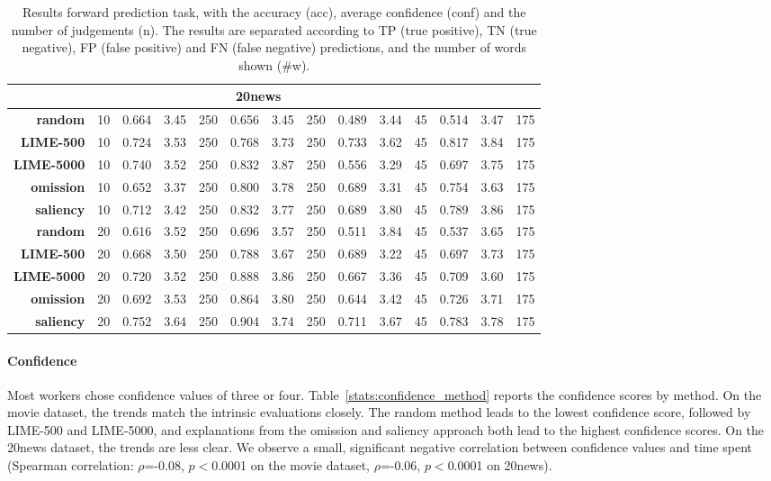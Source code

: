 \documentclass[11pt,a4paper]{article}
\begin{document}
\begin{table*}[h!]
\begin{tabular}{rc|ccc|ccc|ccc|ccc}
\midrule 
\multicolumn{13}{c}{\textbf{20news}}\\
\midrule 
\textbf{random}&10&0.664 & 3.45 & 250 & 0.656 & 3.45 & 250 & 0.489 & 3.44 & 45 & 0.514 & 3.47 & 175  \\
\textbf{LIME-500}&10&0.724 & 3.53 & 250 & 0.768 & 3.73 & 250 & 0.733 & 3.62 & 45 & 0.817 & 3.84 & 175  \\
\textbf{LIME-5000}&10&0.740 & 3.52 & 250 & 0.832 & 3.87 & 250 & 0.556 & 3.29 & 45 & 0.697 & 3.75 & 175  \\
\textbf{omission}&10&0.652 & 3.37 & 250 & 0.800 & 3.78 & 250 & 0.689 & 3.31 & 45 & 0.754 & 3.63 & 175  \\
\textbf{saliency}&10&0.712 & 3.42 & 250 & 0.832 & 3.77 & 250 & 0.689 & 3.80 & 45 & 0.789 & 3.86 & 175  \\

\textbf{random}&20&0.616 & 3.52 & 250 & 0.696 & 3.57 & 250 & 0.511 & 3.84 & 45 & 0.537 & 3.65 & 175  \\
\textbf{LIME-500}&20&0.668 & 3.50 & 250 & 0.788 & 3.67 & 250 & 0.689 & 3.22 & 45 & 0.697 & 3.73 & 175 \\
\textbf{LIME-5000}&20&0.720 & 3.52 & 250 & 0.888 & 3.86 & 250 & 0.667 & 3.36 & 45 & 0.709 & 3.60 & 175  \\
\textbf{omission}&20&0.692 & 3.53 & 250 & 0.864 & 3.80 & 250 & 0.644 & 3.42 & 45 & 0.726 & 3.71 & 175  \\

\textbf{saliency}&20&0.752 & 3.64 & 250 & 0.904 & 3.74 & 250 & 0.711 & 3.67 & 45 & 0.783 & 3.78 & 175  \\

\bottomrule 
\end{tabular} 
\caption{Results forward prediction task, with the accuracy (acc), average confidence (conf) and the number of judgements (n). The results are separated according to TP (true positive), TN (true negative), FP (false positive) and FN (false negative) predictions, and the number of words shown (\#w). }
\label{results:forward}
\end{table*}




\paragraph*{Confidence}
Most workers chose confidence values of three or four.
Table~\ref{stats:confidence_method} reports
the confidence scores  by method. On the movie dataset, the trends match the intrinsic evaluations closely.  The random method leads to the lowest confidence score, followed by LIME-500 and LIME-5000, and explanations from the omission and saliency approach both lead to the highest confidence scores. On the 20news dataset, the trends are less clear.
We observe a small,  significant negative correlation between confidence values and time spent
(Spearman correlation: $\rho$=-0.08, $p<$0.0001 on the movie dataset,  $\rho$=-0.06, $p<$0.0001 on 20news).
\end{document}
